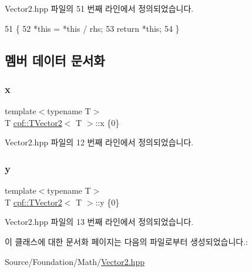 Vector2.\+hpp 파일의 51 번째 라인에서 정의되었습니다.


\begin{DoxyCode}
51                                                   \{
52             *\textcolor{keyword}{this} = *\textcolor{keyword}{this} / rhs;
53             \textcolor{keywordflow}{return} *\textcolor{keyword}{this};
54         \}
\end{DoxyCode}


\subsection{멤버 데이터 문서화}
\mbox{\label{classcpf_1_1_t_vector2_a2c0ac9258353351f1435070a2307e9e1}} 
\subsubsection{\texorpdfstring{x}{x}}
{\footnotesize\ttfamily template$<$typename T$>$ \\
T \hyperlink{classcpf_1_1_t_vector2}{cpf\+::\+T\+Vector2}$<$ T $>$\+::x \{0\}}



Vector2.\+hpp 파일의 12 번째 라인에서 정의되었습니다.

\mbox{\label{classcpf_1_1_t_vector2_a727b923b39a876bbb13c810bcf6eecff}} 
\subsubsection{\texorpdfstring{y}{y}}
{\footnotesize\ttfamily template$<$typename T$>$ \\
T \hyperlink{classcpf_1_1_t_vector2}{cpf\+::\+T\+Vector2}$<$ T $>$\+::y \{0\}}



Vector2.\+hpp 파일의 13 번째 라인에서 정의되었습니다.



이 클래스에 대한 문서화 페이지는 다음의 파일로부터 생성되었습니다.\+:\begin{DoxyCompactItemize}
\item 
Source/\+Foundation/\+Math/\hyperlink{_vector2_8hpp}{Vector2.\+hpp}\end{DoxyCompactItemize}
